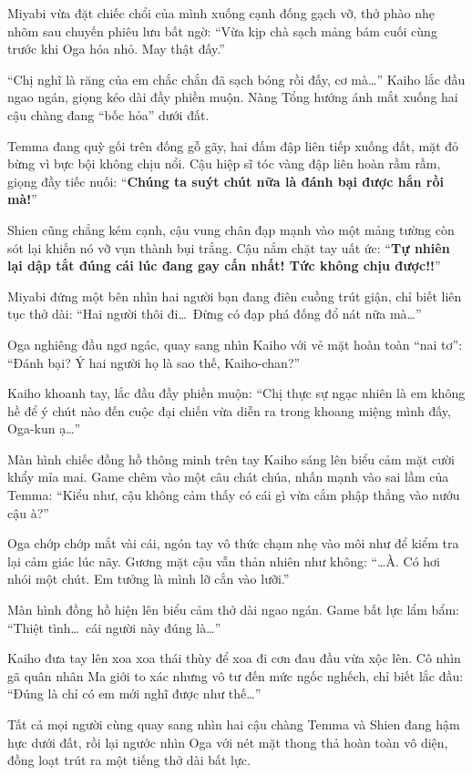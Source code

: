 \documentclass[../main.tex]{subfiles}
\begin{document}
Miyabi vừa đặt chiếc chổi của mình xuống cạnh đống gạch vỡ, thở phào nhẹ nhõm sau chuyến phiêu lưu bất ngờ: ``Vừa kịp chà sạch mảng bám cuối cùng trước khi Oga hóa nhỏ. May thật đấy.''

``Chị nghĩ là răng của em chắc chắn đã sạch bóng rồi đấy, cơ mà\dots'' Kaiho lắc đầu ngao ngán, giọng kéo dài đầy phiền muộn. Nàng Tổng hướng ánh mắt xuống hai cậu chàng đang ``bốc hỏa'' dưới đất.

Temma đang quỳ gối trên đống gỗ gãy, hai đấm đập liên tiếp xuống đất, mặt đỏ bừng vì bực bội không chịu nổi. Cậu hiệp sĩ tóc vàng đập liên hoàn rầm rầm, giọng đầy tiếc nuối: ``\textbf{Chúng ta suýt chút nữa là đánh bại được hắn rồi mà!}''

Shien cũng chẳng kém cạnh, cậu vung chân đạp mạnh vào một mảng tường còn sót lại khiến nó vỡ vụn thành bụi trắng. Cậu nắm chặt tay uất ức: ``\textbf{Tự nhiên lại dập tắt đúng cái lúc đang gay cấn nhất! Tức không chịu được!!}''

Miyabi đứng một bên nhìn hai người bạn đang điên cuồng trút giận, chỉ biết liên tục thở dài: ``Hai người thôi đi\dots\ Đừng có đạp phá đống đổ nát nữa mà\dots''


Oga nghiêng đầu ngơ ngác, quay sang nhìn Kaiho với vẻ mặt hoàn toàn ``nai tơ'': ``Đánh bại? Ý hai người họ là sao thế, Kaiho-chan?''

Kaiho khoanh tay, lắc đầu đầy phiền muộn: ``Chị thực sự ngạc nhiên là em không hề để ý chút nào đến cuộc đại chiến vừa diễn ra trong khoang miệng mình đấy, Oga-kun ạ\dots''

Màn hình chiếc đồng hồ thông minh trên tay Kaiho sáng lên biểu cảm mặt cười khẩy mỉa mai. Game chêm vào một câu chát chúa, nhấn mạnh vào sai lầm của Temma: ``Kiểu như, cậu không cảm thấy có cái gì vừa cắm phập thẳng vào nướu cậu à?''

Oga chớp chớp mắt vài cái, ngón tay vô thức chạm nhẹ vào môi như để kiểm tra lại cảm giác lúc nãy. Gương mặt cậu vẫn thản nhiên như không: ``\dots À. Có hơi nhói một chút. Em tưởng là mình lỡ cắn vào lưỡi.''

Màn hình đồng hồ hiện lên biểu cảm thở dài ngao ngán. Game bất lực lẩm bẩm: ``Thiệt tình\dots\ cái người này đúng là\dots''

Kaiho đưa tay lên xoa xoa thái thùy để xoa đi cơn đau đầu vừa xộc lên. Cô nhìn gã quân nhân Ma giới to xác nhưng vô tư đến mức ngốc nghếch, chỉ biết lắc đầu: ``Đúng là chỉ có em mới nghĩ được như thế\dots''

Tất cả mọi người cùng quay sang nhìn hai cậu chàng Temma và Shien đang hậm hực dưới đất, rồi lại ngước nhìn Oga với nét mặt thong thả hoàn toàn vô diện, đồng loạt trút ra một tiếng thở dài bất lực.
\end{document}
